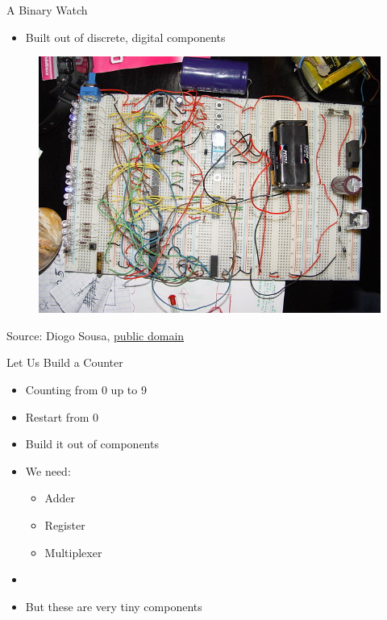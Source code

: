 \begin{frame}[fragile]{A Binary Watch}
\begin{itemize}
\item Built out of discrete, digital components
\end{itemize}
\begin{figure}
    \centering
    \href{https://commons.wikimedia.org/wiki/File:Relogio_binario.JPG}{\includegraphics[scale=0.3]{binary-watch.jpg}}
\end{figure}

{\tiny Source: Diogo Sousa, \href{https://en.wikipedia.org/wiki/Public_domain}{public domain}}
\end{frame}


\begin{frame}[fragile]{Let Us Build a Counter}
\begin{itemize}
\item Counting from 0 up to 9
\item Restart from 0
\item Build it out of components
\item We need:
\begin{itemize}
\item Adder
\item Register
\item Multiplexer
\end{itemize}
\item
\item But these are very tiny components
\end{itemize}
\end{frame}

